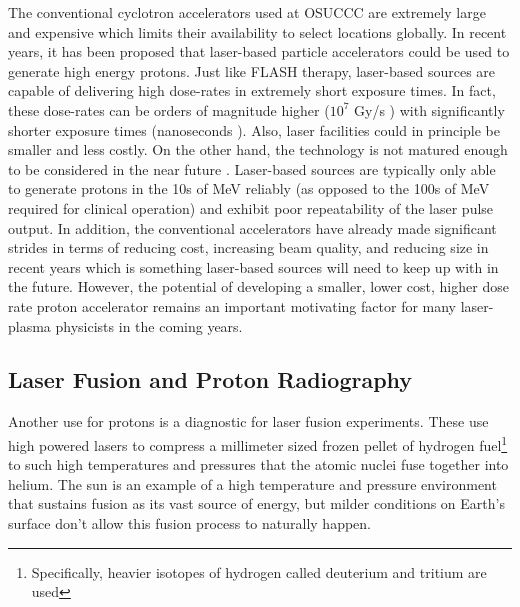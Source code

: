 The conventional cyclotron accelerators used at \gls{OSUCCC} are extremely large and expensive which limits their availability to select locations globally. In recent years, it has been proposed that laser-based particle accelerators could be used to generate high energy protons. Just like FLASH therapy, laser-based sources are capable of delivering high dose-rates in extremely short exposure times. In fact, these dose-rates can be orders of magnitude higher ($10^7$ Gy/s \cite{Bin_2022_SciRep}) with significantly shorter exposure times (nanoseconds \cite{Bin_2022_SciRep}). Also, laser facilities could in principle be smaller and less costly. On the other hand, the technology is not matured enough to be considered in the near future \cite{Linz_2016_LaPB}. Laser-based sources are typically only able to generate protons in the 10s of MeV reliably (as opposed to the 100s of MeV required for clinical operation) and exhibit poor repeatability of the laser pulse output. In addition, the conventional accelerators have already made significant strides in terms of reducing cost, increasing beam quality, and reducing size in recent years \cite{Linz_2016_LaPB} which is something laser-based sources will need to keep up with in the future. However, the potential of developing a smaller, lower cost, higher dose rate proton accelerator remains an important motivating factor for many laser-plasma physicists in the coming years.

\subsection{Laser Fusion and Proton Radiography}

Another use for protons is a diagnostic for laser fusion experiments. These use high powered lasers to compress a millimeter sized frozen pellet of hydrogen fuel\footnote{Specifically, heavier isotopes of hydrogen called deuterium and tritium are used} to such high temperatures and pressures that the atomic nuclei fuse together into helium. The sun is an example of a high temperature and pressure environment that sustains fusion as its vast source of energy, but milder conditions on Earth's surface don't allow this fusion process to naturally happen. 

